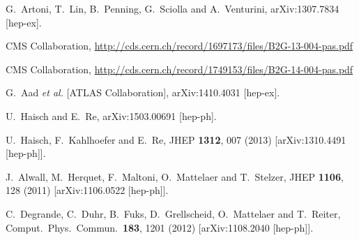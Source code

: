\begin{thebibliography}{90}
  G.~Artoni, T.~Lin, B.~Penning, G.~Sciolla and A.~Venturini,
  arXiv:1307.7834 [hep-ex].
  
  CMS Collaboration,
  \href{http://cds.cern.ch/record/1697173/files/B2G-13-004-pas.pdf}{http://cds.cern.ch/record/1697173/files/B2G-13-004-pas.pdf}
  
  CMS Collaboration,
  \href{http://cds.cern.ch/record/1749153/files/B2G-14-004-pas.pdf}{http://cds.cern.ch/record/1749153/files/B2G-14-004-pas.pdf}
  
  G.~Aad {\it et al.}  [ATLAS Collaboration],
  arXiv:1410.4031 [hep-ex].
  
  U.~Haisch and E.~Re,
  arXiv:1503.00691 [hep-ph].
  
  U.~Haisch, F.~Kahlhoefer and E.~Re,
  JHEP {\bf 1312}, 007 (2013)
  [arXiv:1310.4491 [hep-ph]].
  
  J.~Alwall, M.~Herquet, F.~Maltoni, O.~Mattelaer and T.~Stelzer,
  JHEP {\bf 1106}, 128 (2011)
  [arXiv:1106.0522 [hep-ph]].
  
   
  C.~Degrande, C.~Duhr, B.~Fuks, D.~Grellscheid, O.~Mattelaer and T.~Reiter,
  Comput.\ Phys.\ Commun.\  {\bf 183}, 1201 (2012)
  [arXiv:1108.2040 [hep-ph]].
  

\end{thebibliography}
